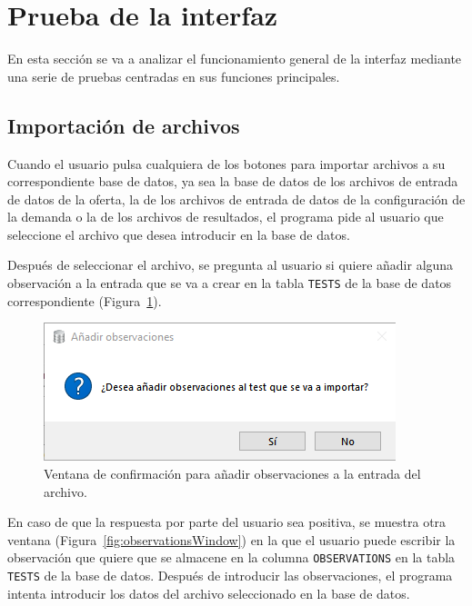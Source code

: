 \section{Prueba de la interfaz}
\label{sec:UIResults}

En esta sección se va a analizar el funcionamiento general de la interfaz mediante una serie de pruebas centradas en sus funciones principales.

\subsection{Importación de archivos}
\label{sec:PruebasImportacionArchivos}

Cuando el usuario pulsa cualquiera de los botones para importar archivos a su correspondiente base de datos, ya sea la base de datos de los archivos de entrada de datos de la oferta, la de los archivos de entrada de datos de la configuración de la demanda o la de los archivos de resultados, el programa pide al usuario que seleccione el archivo que desea introducir en la base de datos.

Después de seleccionar el archivo, se pregunta al usuario si quiere añadir alguna observación a la entrada que se va a crear en la tabla \texttt{TESTS} de la base de datos correspondiente (Figura~\ref{fig:askForObservations}). 

\begin{figure}[H]
    \centering
    \includegraphics[width=0.6\linewidth]{fig/Interfaz de la aplicación/añadir observaciones.png}
    \caption{Ventana de confirmación para añadir observaciones a la entrada del archivo.}
    \label{fig:askForObservations}
\end{figure}

En caso de que la respuesta por parte del usuario sea positiva, se muestra otra ventana (Figura~\ref{fig:observationsWindow}) en la que el usuario puede escribir la observación que quiere que se almacene en la columna \texttt{OBSERVATIONS} en la tabla \texttt{TESTS} de la base de datos. Después de introducir las observaciones, el programa intenta introducir los datos del archivo seleccionado en la base de datos. 

